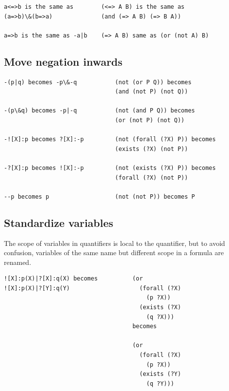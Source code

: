 \documentclass{book}
\begin{document}
\begin{verbatim}					
a<=>b is the same as        (<=> A B) is the same as 
(a=>b)\&(b=>a)              (and (=> A B) (=> B A))

a=>b is the same as -a|b    (=> A B) same as (or (not A) B)
\end{verbatim}

\subsection{Move negation inwards}

\begin{verbatim}
-(p|q) becomes -p\&-q           (not (or P Q)) becomes 
                                (and (not P) (not Q))
                                
-(p\&q) becomes -p|-q           (not (and P Q)) becomes 
                                (or (not P) (not Q))
                                
-![X]:p becomes ?[X]:-p	        (not (forall (?X) P)) becomes 
                                (exists (?X) (not P))
                                
-?[X]:p becomes ![X]:-p	        (not (exists (?X) P)) becomes 
                                (forall (?X) (not P))
                                
--p becomes p                   (not (not P)) becomes P
\end{verbatim}

\subsection{Standardize variables}

The scope of variables in quantifiers is local to the quantifier, but to avoid
confusion, variables of the same name but different scope in a formula are
renamed.

\begin{verbatim}
![X]:p(X)|?[X]:q(X) becomes          (or 
![X]:p(X)|?[Y]:q(Y)                    (forall (?X) 
                                         (p ?X)) 
                                       (exists (?X) 
                                         (q ?X)))
                                     becomes
                                     
                                     (or 
                                       (forall (?X) 
                                         (p ?X)) 
                                       (exists (?Y) 
                                         (q ?Y)))
\end{verbatim}
\end{document}
